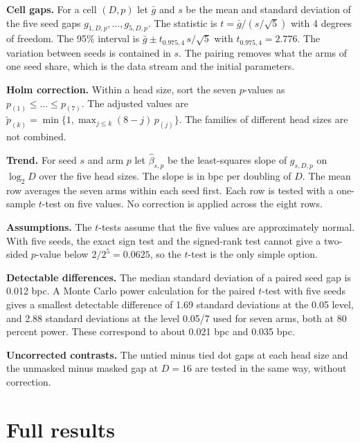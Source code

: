 \documentclass[11pt]{article}
\begin{document}
\textbf{Cell gaps.}
For a cell $(D,p)$ let $\bar g$ and $s$ be the mean and standard deviation of the five seed gaps $g_{1,D,p},\dots,g_{5,D,p}$.
The statistic is $t=\bar g/(s/\sqrt5)$ with 4 degrees of freedom.
The 95\% interval is $\bar g\pm t_{0.975,4}\,s/\sqrt5$ with $t_{0.975,4}=2.776$.
The variation between seeds is contained in $s$.
The pairing removes what the arms of one seed share, which is the data stream and the initial parameters.

\textbf{Holm correction.}
Within a head size, sort the seven $p$-values as $p_{(1)}\le\dots\le p_{(7)}$.
The adjusted values are $\tilde p_{(k)}=\min\{1,\max_{j\le k}(8-j)\,p_{(j)}\}$.
The families of different head sizes are not combined.

\textbf{Trend.}
For seed $s$ and arm $p$ let $\hat\beta_{s,p}$ be the least-squares slope of $g_{s,D,p}$ on $\log_2 D$ over the five head sizes.
The slope is in bpc per doubling of $D$.
The mean row averages the seven arms within each seed first.
Each row is tested with a one-sample $t$-test on five values.
No correction is applied across the eight rows.

\textbf{Assumptions.}
The $t$-tests assume that the five values are approximately normal.
With five seeds, the exact sign test and the signed-rank test cannot give a two-sided $p$-value below $2/2^5=0.0625$, so the $t$-test is the only simple option.

\textbf{Detectable differences.}
The median standard deviation of a paired seed gap is 0.012 bpc.
A Monte Carlo power calculation for the paired $t$-test with five seeds gives a smallest detectable difference of 1.69 standard deviations at the 0.05 level, and 2.88 standard deviations at the level 0.05/7 used for seven arms, both at 80 percent power.
These correspond to about 0.021 bpc and 0.035 bpc.

\textbf{Uncorrected contrasts.}
The untied minus tied dot gaps at each head size and the unmasked minus masked gap at $D=16$ are tested in the same way, without correction.

\section{Full results}\label{app:full}

\begin{table}[h]
\centering\small

\caption{Final validation bpc by cell, mean $\pm$ standard deviation over five seeds.}
\end{table}
\end{document}
